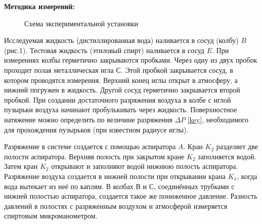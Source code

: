 \documentclass[a4paper, 12pt]{article}%
\begin{document}
	
\textbf{Методика измерений: }\\
	
	\begin{figure}[h]
		\caption{Схема экспериментальной установки}
	\end{figure}
	
	Исследуемая жидкость (дистиллированная вода) наливается в сосуд (колбу) $ B $ (рис.1). Тестовая жидкость  (этиловый спирт) наливается  в сосуд $ E $.  При измерениях  колбы герметично закрываются  пробками. Через одну из двух пробок  проходит полая металлическая игла $ С $. Этой пробкой закрывается сосуд, в котором  проводятся измерения. Верхний конец иглы открыт в атмосферу, а нижний погружен в жидкость. Другой сосуд герметично закрывается второй пробкой. При создании достаточного  разряжения воздуха в колбе с иглой пузырьки воздуха начинают пробулькивать через жидкость. Поверхностное натяжение можно определить по величине разряжения $ \Delta P $ \eqref{key}, необходимого для прохождения пузырьков (при известном радиусе иглы).
	
	Разряжение в системе создается с помощью аспиратора $ A $. Кран $ K_2 $ разделяет две полости аспиратора. Верхняя полость при закрытом кране $ K_2 $ заполняется водой. Затем кран $ K_2 $ открывают и заполняют водой  нижнюю полость  аспиратора.  Разряжение воздуха создается в нижней полости  при открывании крана $ K_1 $, когда  вода вытекает из неё по каплям. В колбах $ В $ и $ С $, соединённых трубками с нижней полостью аспиратора, создается такое же пониженное давление. Разность давлений в полостях с разряженным воздухом и атмосферой измеряется спиртовым микроманометром. 
	
\end{document}
